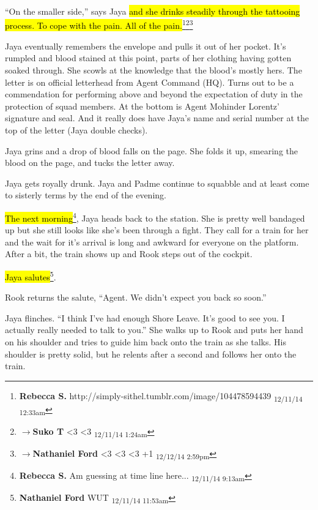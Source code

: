 ``On the smaller side,'' says Jaya \hl{and she drinks steadily through the tattooing process.  To cope with the pain.  All of the pain.}\footnote{\textbf{Rebecca S. }http://simply-sithel.tumblr.com/image/104478594439 \textsubscript{12/11/14 12:33am}}\footnote{$\rightarrow$\textbf{Suko T }\textless 3 \textless 3 \textsubscript{12/11/14 1:24am}}\footnote{$\rightarrow$\textbf{Nathaniel Ford }\textless 3 \textless 3 \textless 3 +1 \textsubscript{12/12/14 2:59pm}}

Jaya eventually remembers the envelope and pulls it out of her pocket.  It's rumpled and blood stained at this point, parts of her clothing having gotten soaked through.  She scowls at the knowledge that the blood's mostly hers.  The letter is on official letterhead from Agent Command (HQ).  Turns out to be a commendation for performing above and beyond the expectation of duty in the protection of squad members. At the bottom is Agent Mohinder Lorentz' signature and seal.  And it really does have Jaya's name and serial number at the top of the letter (Jaya double checks).

Jaya grins and a drop of blood falls on the page.  She folds it up, smearing the blood on the page, and tucks the letter away.

Jaya gets royally drunk.  Jaya and Padme continue to squabble and at least come to sisterly terms by the end of the evening.  



\hl{The next morning}\footnote{\textbf{Rebecca S. }Am guessing at time line here... \textsubscript{12/11/14 9:13am}}, Jaya heads back to the station. She is pretty well bandaged up but she still looks like she's been through a fight.  They call for a train for her and the wait for it's arrival is long and awkward for everyone on the platform.  After a bit, the train shows up and Rook steps out of the cockpit. 

\hl{Jaya salutes}\footnote{\textbf{Nathaniel Ford }WUT \textsubscript{12/11/14 11:53am}}.

Rook returns the salute, ``Agent.  We didn't expect you back so soon.''

Jaya flinches. ``I think I've had enough Shore Leave.  It's good to see you.  I actually really needed to talk to you.''  She walks up to Rook and puts her hand on his shoulder and tries to guide him back onto the train as she talks.  His shoulder is pretty solid, but he relents after a second and follows her onto the train.

